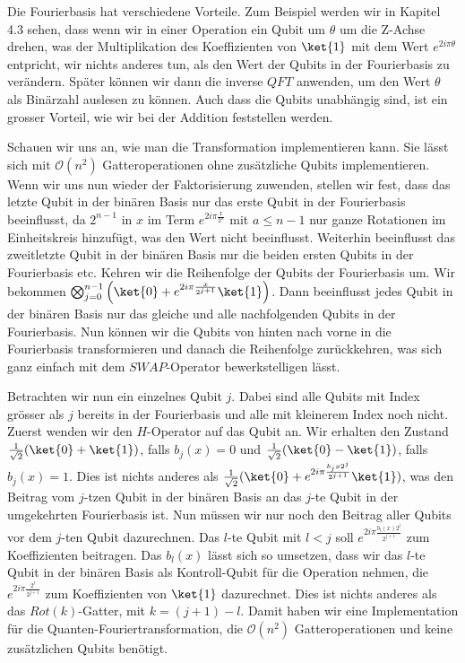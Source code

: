 
Die Fourierbasis hat verschiedene Vorteile. Zum Beispiel werden wir in Kapitel 4.3 sehen, dass wenn wir in einer Operation ein Qubit um $\theta$ um die Z-Achse drehen, was der Multiplikation des Koeffizienten von $\ket{1}$ mit dem Wert $e^{2i\pi\theta}$ entpricht, wir nichts anderes tun, als den Wert der Qubits in der Fourierbasis zu verändern. Später können wir dann die inverse $QFT$ anwenden, um den Wert $\theta$ als Binärzahl auslesen zu können. Auch dass die Qubits unabhängig sind, ist ein grosser Vorteil, wie wir bei der Addition feststellen werden.

Schauen wir uns an, wie man die Transformation implementieren kann. Sie lässt sich mit $\mathcal O(n^2)$ Gatteroperationen ohne zusätzliche Qubits implementieren. Wenn wir uns nun wieder der Faktorisierung zuwenden, stellen wir fest, dass das letzte Qubit in der binären Basis nur das erste Qubit in der Fourierbasis beeinflusst, da $2^{n - 1}$ in $x$ im Term $e^{2i\pi\frac{x}{2^a}}$ mit $a \leq n - 1$ nur ganze Rotationen im Einheitskreis hinzufügt, was den Wert nicht beeinflusst. Weiterhin beeinflusst das zweitletzte Qubit in der binären Basis nur die beiden ersten Qubits in der Fourierbasis etc. Kehren wir die Reihenfolge der Qubits der Fourierbasis um. Wir bekommen $\bigotimes_{j = 0}^{n - 1}\left(\ket{0} + e^{2i\pi\frac{x}{2^{j + 1}}}\ket{1}\right)$. Dann beeinflusst jedes Qubit in der binären Basis nur das gleiche und alle nachfolgenden Qubits in der Fourierbasis. Nun können wir die Qubits von hinten nach vorne in die Fourierbasis transformieren und danach die Reihenfolge zurückkehren, was sich ganz einfach mit dem $SWAP$-Operator bewerkstelligen lässt. 

Betrachten wir nun ein einzelnes Qubit $j$. Dabei sind alle Qubits mit Index grösser als $j$ bereits in der Fourierbasis und alle mit kleinerem Index noch nicht. Zuerst wenden wir den $H$-Operator auf das Qubit an. Wir erhalten den Zustand $\frac{1}{\sqrt{2}}(\ket{0} + \ket{1})$, falls $b_j(x) = 0$ und $\frac{1}{\sqrt{2}}(\ket{0} - \ket{1})$, falls $b_j(x) = 1$. Dies ist nichts anderes als $\frac{1}{\sqrt{2}}(\ket{0} + e^{2i\pi\frac{b_j{x}2^j}{2^{j + 1}}}\ket{1})$, was den Beitrag vom $j$-tzen Qubit in der binären Basis an das $j$-te Qubit in der umgekehrten Fourierbasis ist. Nun müssen wir nur noch den Beitrag aller Qubits vor dem $j$-ten Qubit dazurechnen. Das $l$-te Qubit mit $l < j$ soll $e^{2i\pi\frac{b_l(x)2^{l}}{2^{j + 1}}}$ zum Koeffizienten beitragen. Das $b_l(x)$ lässt sich so umsetzen, dass wir das $l$-te Qubit in der binären Basis als Kontroll-Qubit für die Operation nehmen, die $e^{2i\pi\frac{2^{l}}{2^{j + 1}}}$ zum Koeffizienten von $\ket{1}$ dazurechnet. Dies ist nichts anderes als das $Rot(k)$-Gatter, mit $k = (j + 1) - l$. Damit haben wir eine Implementation für die Quanten-Fouriertransformation, die $\mathcal O(n^2)$ Gatteroperationen und keine zusätzlichen Qubits benötigt.

